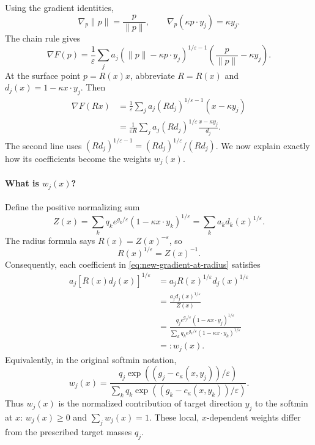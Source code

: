 Using the gradient identities,
\[
 \nabla_p\|p\|=\frac{p}{\|p\|},
 \qquad \nabla_p(\kappa p\cdot y_j)=\kappa y_j.
\]
The chain rule gives
\begin{equation}
 \nabla F(p)=\frac1\varepsilon\sum_j
 a_j(\|p\|-\kappa p\cdot y_j)^{1/\varepsilon-1}
 \left(\frac{p}{\|p\|}-\kappa y_j\right).
\end{equation}
At the surface point $p=R(x)x$, abbreviate $R=R(x)$ and
$d_j(x)=1-\kappa x\cdot y_j$. Then
\begin{align}
 \nabla F(Rx)
 &=\frac1\varepsilon\sum_j a_j(Rd_j)^{1/\varepsilon-1}
       (x-\kappa y_j) \\
 &=\frac1{\varepsilon R}\sum_j
       a_j(Rd_j)^{1/\varepsilon}\frac{x-\kappa y_j}{d_j}.
 \label{eq:new-gradient-at-radius}
\end{align}
The second line uses
$(Rd_j)^{1/\varepsilon-1}=(Rd_j)^{1/\varepsilon}/(Rd_j)$.
We now explain exactly how its coefficients become the weights $w_j(x)$.

\paragraph{What is $w_j(x)$?}
Define the positive normalizing sum
\[
 Z(x)=\sum_k q_ke^{g_k/\varepsilon}
                  (1-\kappa x\cdot y_k)^{1/\varepsilon}
     =\sum_k a_kd_k(x)^{1/\varepsilon}.
\]
The radius formula says $R(x)=Z(x)^{-\varepsilon}$, so
\[
 R(x)^{1/\varepsilon}=Z(x)^{-1}.
\]
Consequently, each coefficient in
\eqref{eq:new-gradient-at-radius} satisfies
\begin{align}
 a_j[R(x)d_j(x)]^{1/\varepsilon}
 &=a_jR(x)^{1/\varepsilon}d_j(x)^{1/\varepsilon} \\
 &=\frac{a_jd_j(x)^{1/\varepsilon}}{Z(x)} \\
 &=\frac{q_je^{g_j/\varepsilon}
              (1-\kappa x\cdot y_j)^{1/\varepsilon}}
         {\sum_kq_ke^{g_k/\varepsilon}
              (1-\kappa x\cdot y_k)^{1/\varepsilon}} \\
 &=:w_j(x).
 \label{eq:new-softmin-weights}
\end{align}
Equivalently, in the original softmin notation,
\begin{equation}
 w_j(x)=
 \frac{q_j\exp((g_j-c_\kappa(x,y_j))/\varepsilon)}
      {\sum_kq_k\exp((g_k-c_\kappa(x,y_k))/\varepsilon)}.
\end{equation}
Thus $w_j(x)$ is the normalized contribution of target direction $y_j$
to the softmin at $x$: $w_j(x)\geq0$ and $\sum_jw_j(x)=1$.
These local, $x$-dependent weights differ from the prescribed target
masses $q_j$.

